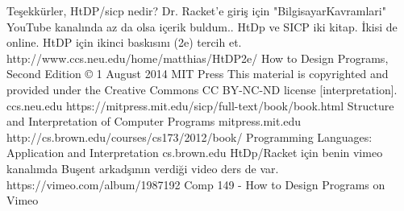 \documentclass[a4paper,10pt]{article}
\begin{document}
Teşekkürler, HtDP/sicp nedir? Dr. Racket'e giriş için "BilgisayarKavramlari" YouTube kanalında az da olsa içerik buldum..
HtDp ve SICP iki kitap. İkisi de online. HtDP için ikinci baskısını (2e)  tercih et.
http://www.ccs.neu.edu/home/matthias/HtDP2e/
How to Design Programs, Second Edition
© 1 August 2014 MIT Press This material is copyrighted and provided under the Creative Commons CC BY-NC-ND license [interpretation].
ccs.neu.edu
https://mitpress.mit.edu/sicp/full-text/book/book.html
Structure and Interpretation of Computer Programs
mitpress.mit.edu
http://cs.brown.edu/courses/cs173/2012/book/
Programming Languages: Application and Interpretation
cs.brown.edu
HtDp/Racket için benin vimeo kanalımda Buşent arkadşının verdiği video ders de var. https://vimeo.com/album/1987192
Comp 149 - How to Design Programs on Vimeo




   
\end{document}
